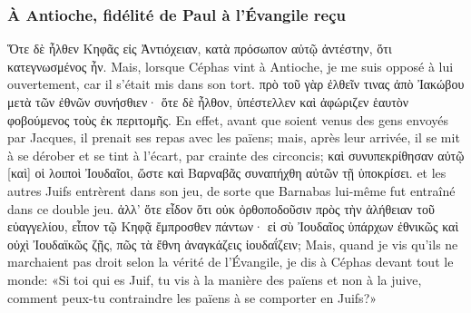 \documentclass[14pt,a4paper,twoside]{extarticle}
\begin{document}
\begin{paracol}[1]
  \subsubsection*{À Antioche, fidélité de Paul à l'Évangile reçu}
  \verset
  {Ὅτε δὲ ἦλθεν Κηφᾶς εἰς Ἀντιόχειαν, κατὰ πρόσωπον αὐτῷ ἀντέστην, ὅτι κατεγνωσμένος ἦν.}
  {Mais, lorsque Céphas vint à Antioche, je me suis opposé à lui ouvertement, car il s’était mis dans son tort.}
  \verset
  {πρὸ τοῦ γὰρ ἐλθεῖν τινας ἀπὸ Ἰακώβου μετὰ τῶν ἐθνῶν συνήσθιεν· ὅτε δὲ ἦλθον, ὑπέστελλεν καὶ ἀφώριζεν ἑαυτὸν φοβούμενος τοὺς ἐκ περιτομῆς.}
  {En effet, avant que soient venus des gens envoyés par Jacques, il prenait ses repas avec les païens; mais, après leur arrivée, il se mit à se dérober et se tint à l’écart, par crainte des circoncis;}
  \verset
  {καὶ συνυπεκρίθησαν αὐτῷ [καὶ] οἱ λοιποὶ Ἰουδαῖοι, ὥστε καὶ Βαρναβᾶς συναπήχθη αὐτῶν τῇ ὑποκρίσει.}
  {et les autres Juifs entrèrent dans son jeu, de sorte que Barnabas lui-même fut entraîné dans ce double jeu.}
  \verset
  {ἀλλ’ ὅτε εἶδον ὅτι οὐκ ὀρθοποδοῦσιν πρὸς τὴν ἀλήθειαν τοῦ εὐαγγελίου, εἶπον τῷ Κηφᾷ ἔμπροσθεν πάντων· εἰ σὺ Ἰουδαῖος ὑπάρχων ἐθνικῶς καὶ οὐχὶ Ἰουδαϊκῶς ζῇς, πῶς τὰ ἔθνη ἀναγκάζεις ἰουδαΐζειν;}
  {Mais, quand je vis qu’ils ne marchaient pas droit selon la vérité de l’Évangile, je dis à Céphas devant tout le monde: «Si toi qui es Juif, tu vis à la manière des païens et non à la juive, comment peux-tu contraindre les païens à se comporter en Juifs?»}

\end{paracol}
\end{document}
